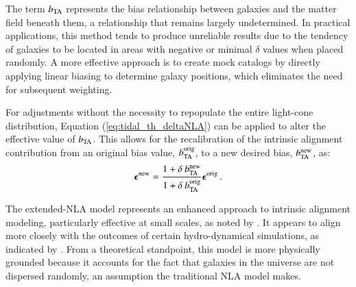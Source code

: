 The term $b_{\rm TA}$ represents the bias relationship between galaxies and the matter field beneath them, a relationship that remains largely undetermined.
In practical applications, this method tends to produce unreliable results due to the tendency of galaxies to be located in areas with negative or minimal $\delta$ values when placed randomly.
A more effective approach is to create mock catalogs by directly applying linear biasing to determine galaxy positions, which eliminates the need for subsequent weighting.

For adjustments without the necessity to repopulate the entire light-cone distribution, Equation (\ref{eq:tidal_th_deltaNLA}) can be applied to alter the effective value of $b_{\rm TA}$. This allows for the recalibration of the intrinsic alignment contribution from an original bias value, $b_{\rm TA}^{\rm orig}$, to a new desired bias, $b_{\rm TA}^{\rm new}$, as:
\begin{eqnarray}
{\boldsymbol \epsilon}^{\rm new} = \frac{1 + \delta \: b_{\rm TA}^{\rm new}}{1 + \delta \: b_{\rm TA}^{\rm orig}}{\boldsymbol \epsilon}^{\rm orig} \, .
\label{eq:bta_rescale}
\end{eqnarray}

The extended-NLA model represents an enhanced approach to intrinsic alignment modeling, particularly effective at small scales, as noted by \citealt{Blazek2019}. 
It appears to align more closely with the outcomes of certain hydro-dynamical simulations, as indicated by \citealt{Hilbert_IA2017}.
From a theoretical standpoint, this model is more physically grounded because it accounts for the fact that galaxies in the universe are not dispersed randomly, an assumption the traditional NLA model makes.

